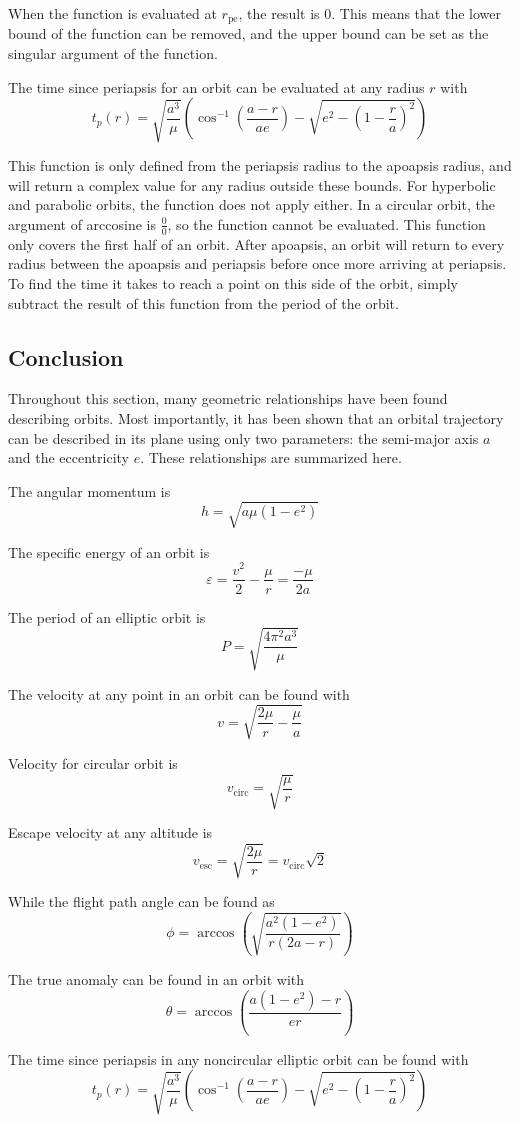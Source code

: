 \documentclass[../main.tex]{subfiles}
\begin{document}
When the function is evaluated at $r_\text{pe}$, the result is $0$. This means that the lower bound of the function can be removed, and the upper bound can be set as the singular argument of the function.

The time since periapsis for an orbit can be evaluated at any radius $r$ with
\begin{equation}\label{Time since periapsis}
    t_p(r)=\sqrt{\frac{a^3}{\mu}}\left(\cos^{-1}\left(\frac{a-r}{ae}\right)- \sqrt{e^2-\left(1-\frac{r}{a}\right)^2}\right)
\end{equation}

This function is only defined from the periapsis radius to the apoapsis radius, and will return a complex value for any radius outside these bounds. For hyperbolic and parabolic orbits, the function does not apply either. In a circular orbit, the argument of arccosine is $\frac{0}{0}$, so the function cannot be evaluated. This function only covers the first half of an orbit. After apoapsis, an orbit will return to every radius between the apoapsis and periapsis before once more arriving at periapsis. To find the time it takes to reach a point on this side of the orbit, simply subtract the result of this function from the period of the orbit.

\bigskip\bigskip
\subsection{Conclusion}

Throughout this section, many geometric relationships have been found describing orbits. Most importantly, it has been shown that an orbital trajectory can be described in its plane using only two parameters: the semi-major axis $a$ and the eccentricity $e$. These relationships are summarized here.

\bigskip
The angular momentum is
$$h=\sqrt{a\mu(1-e^2)}$$

\bigskip
The specific energy of an orbit is
$$\varepsilon=\frac{v^2}{2}-\frac{\mu}{r}=\frac{-\mu}{2a}$$

\bigskip
The period of an elliptic orbit is
$$P=\sqrt{\frac{4\pi^2a^3}{\mu}}$$

\bigskip
The velocity at any point in an orbit can be found with
$$v=\sqrt{\frac{2\mu}{r}-\frac{\mu}{a}}$$

Velocity for circular orbit is
$$v_\text{circ}=\sqrt{\frac{\mu}{r}}$$

Escape velocity at any altitude is
$$v_\text{esc}=\sqrt{\frac{2\mu}{r}}=v_\text{circ}\sqrt{2}$$

\bigskip
While the flight path angle can be found as
$$\phi=\arccos\left(\sqrt{\frac{a^2(1-e^2)}{r(2a-r)}}\right)$$

\bigskip
The true anomaly can be found in an orbit with
$$\theta=\arccos\left(\frac{a(1-e^2)-r}{er}\right)$$

\bigskip
The time since periapsis in any noncircular elliptic orbit can be found with
$$t_p(r)=\sqrt{\frac{a^3}{\mu}}\left(\cos^{-1}\left(\frac{a-r}{ae}\right)- \sqrt{e^2-\left(1-\frac{r}{a}\right)^2}\right)$$
\end{document}
